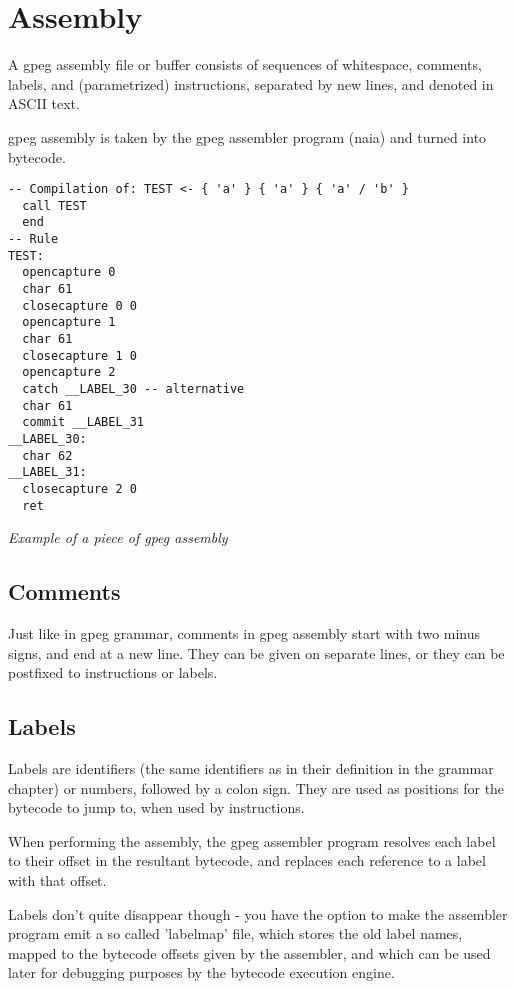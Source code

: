 \section{Assembly}
\label{sec:assembly}

A gpeg assembly file or buffer consists of sequences of
whitespace, comments, labels, and (parametrized) instructions, separated
by new lines, and denoted in ASCII text.

gpeg assembly is taken by the gpeg assembler program (naia) and turned
into bytecode.

\begin{myquote}
\begin{verbatim}
-- Compilation of: TEST <- { 'a' } { 'a' } { 'a' / 'b' }
  call TEST
  end
-- Rule
TEST:
  opencapture 0
  char 61
  closecapture 0 0
  opencapture 1
  char 61
  closecapture 1 0
  opencapture 2
  catch __LABEL_30 -- alternative
  char 61
  commit __LABEL_31
__LABEL_30:
  char 62
__LABEL_31:
  closecapture 2 0
  ret
\end{verbatim}
\end{myquote}
\textit{Example of a piece of gpeg assembly}

\subsection{Comments}

Just like in gpeg grammar,
comments in gpeg assembly start with two minus signs, and end at
a new line. They can be given on separate lines, or they can be
postfixed to instructions or labels.

\subsection{Labels}

Labels are identifiers (the same identifiers as in their definition
in the grammar chapter) or numbers, followed by a colon sign. They are used
as positions for the bytecode to jump to, when used by instructions.

When performing the assembly, the gpeg assembler program resolves
each label to their offset in the resultant bytecode, and replaces each
reference to a label with that offset.

Labels don't quite disappear though - you have the option to make the
assembler program emit a so called 'labelmap' file, which stores the old
label names, mapped to the bytecode offsets given by the assembler,
and which can be used later
for debugging purposes by the bytecode execution engine.

